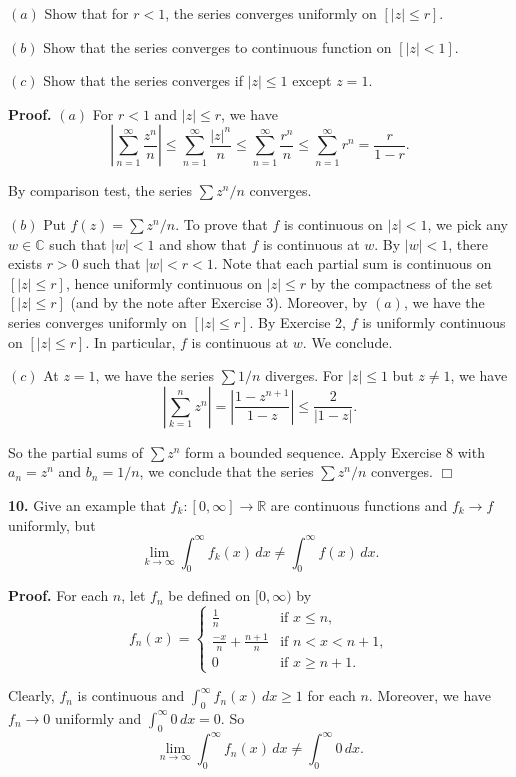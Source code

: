 \documentclass{article}
\begin{document}
$(a)$ Show that for $r < 1$, the series converges uniformly on
$[|z|\le r]$.

$(b)$ Show that the series converges to continuous function on
$[|z| < 1]$.

$(c)$ Show that the series converges if $|z|\le 1$ except $z=1$.

\textbf{Proof.} $(a)$ For $r < 1$ and $|z| \le r$, we have
\[\left|\sum_{n=1}^{\infty} \frac{z^n}{n}\right| \le \sum_{n=1}^{\infty} \frac{|z|^n}{n} \le \sum_{n=1}^{\infty} \frac{r^n}{n} \le \sum_{n=1}^{\infty} r^n = \frac{r}{1-r}.\]

By comparison test, the series $\sum z^n/n$ converges.

$(b)$ Put $f(z) = \sum z^n/n$. To prove that $f$ is continuous on
$|z|< 1$, we pick any $w\in\mathbb{C}$ such that $|w| < 1$ and show that
$f$ is continuous at $w$. By $|w| < 1$, there exists $r > 0$ such that
$|w| < r < 1$. Note that each partial sum is continuous on $[|z|\le r]$,
hence uniformly continuous on $|z| \le r$ by the compactness of the set
$[|z|\le r]$ (and by the note after Exercise 3). Moreover, by $(a)$, we
have the series converges uniformly on $[|z| \le r]$. By Exercise 2, $f$
is uniformly continuous on $[|z| \le r]$. In particular, $f$ is
continuous at $w$. We conclude.

$(c)$ At $z=1$, we have the series $\sum 1/n$ diverges. For $|z| \le 1$
but $z\ne 1$, we have \[
|\sum_{k=1}^n z^n| = \left|\frac{1-z^{n+1}}{1-z}\right| \le \frac{2}{|1-z|}.
\]

So the partial sums of $\sum z^n$ form a bounded sequence. Apply
Exercise 8 with $a_n = z^n$ and $b_n = 1/n$, we conclude that the series
$\sum z^n/n$ converges. $\Box$

    \textbf{10.} Give an example that $f_k:[0,\infty]\to\mathbb{R}$ are
continuous functions and $f_k \to f$ uniformly, but \[
\lim_{k\to\infty}\int_0^{\infty}f_k(x)\,dx \ne \int_0^{\infty} f(x)\,dx.
\]

\textbf{Proof.} For each $n$, let $f_n$ be defined on $[0,\infty)$ by
\[f_n(x) = \begin{cases}
\frac{1}{n} &\text{if }x\le n,\\
\frac{-x}{n} + \frac{n+1}{n} &\text{if } n < x < n+1,\\
0 &\text{if }x\ge n+1.
\end{cases}\]

Clearly, $f_n$ is continuous and $\int_0^{\infty} f_n(x)\,dx \ge 1$ for
each $n$. Moreover, we have $f_n\to 0$ uniformly and
$\int_0^{\infty} 0\, dx = 0$. So \[
\lim_{n\to\infty}\int_0^{\infty}f_n(x)\,dx \ne \int_0^{\infty} 0\,dx.
\]
\end{document}
